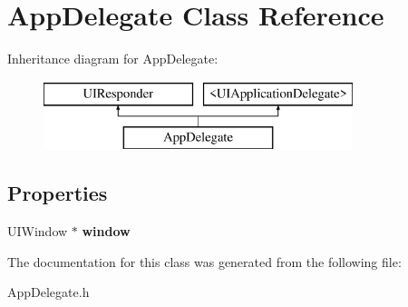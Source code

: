 \hypertarget{interface_app_delegate}{\section{App\+Delegate Class Reference}
\label{interface_app_delegate}
}
Inheritance diagram for App\+Delegate\+:\begin{figure}[H]
\begin{center}
\leavevmode
\includegraphics[height=2.000000cm]{interface_app_delegate}
\end{center}
\end{figure}
\subsection*{Properties}
\begin{DoxyCompactItemize}
\item 
\hypertarget{interface_app_delegate_acf48ac24125e688cac1a85445cd7fac2}{U\+I\+Window $\ast$ {\bfseries window}}\label{interface_app_delegate_acf48ac24125e688cac1a85445cd7fac2}

\end{DoxyCompactItemize}


The documentation for this class was generated from the following file\+:\begin{DoxyCompactItemize}
\item 
App\+Delegate.\+h\end{DoxyCompactItemize}

